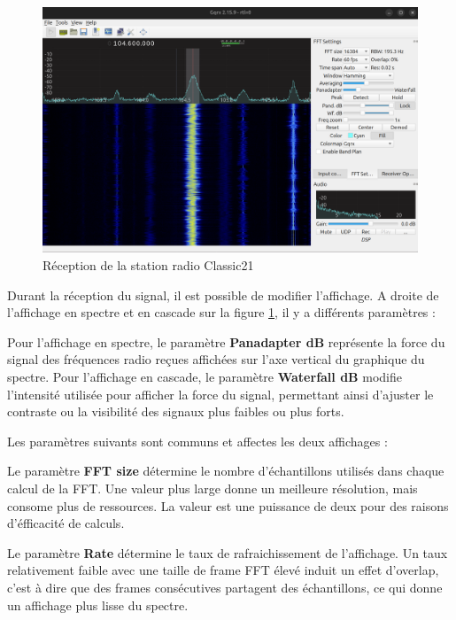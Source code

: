 \newpage

\begin{figure}[h]
\centering

\includegraphics[scale=0.18]{images/gqrx1.png}
\caption{Réception de la station radio Classic21}\label{term38}
\end{figure}

Durant la réception du signal, il est possible de modifier l'affichage. A droite de l'affichage en spectre et en cascade sur la figure \ref{term38}, il y a différents paramètres :

Pour l'affichage en spectre, le paramètre \textbf{Panadapter dB} représente la force du signal des fréquences radio reçues affichées sur l'axe vertical du graphique du spectre. Pour l'affichage en cascade, le paramètre \textbf{Waterfall dB} modifie l'intensité utilisée pour afficher la force du signal, permettant ainsi d'ajuster le contraste ou la visibilité des signaux plus faibles ou plus forts. 

\vspace{0.1cm}

Les paramètres suivants sont communs et affectes les deux affichages :

\vspace{0.1cm}

Le paramètre \textbf{FFT size} détermine le nombre d'échantillons utilisés dans chaque calcul de la FFT. Une valeur plus large donne un meilleure résolution, mais consome plus de ressources. La valeur est une puissance de deux pour des raisons d'éfficacité de calculs.

\vspace{0.1cm}

Le paramètre \textbf{Rate} détermine le taux de rafraichissement de l'affichage. Un taux relativement faible avec une taille de frame FFT élevé induit un effet d'overlap, c'est à dire que des frames consécutives partagent des échantillons, ce qui donne un affichage plus lisse du spectre.


